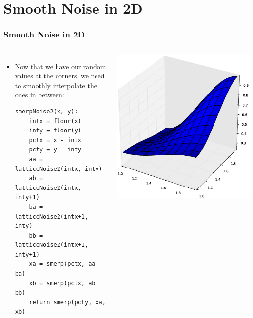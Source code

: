 \documentclass[slidestop,xcolor=pst]{beamer}
\newcommand{\sect}[1]{
\section{#1}
\begin{frame}[fragile]\frametitle{#1}
}
\begin{document}
\sect{Smooth Noise in 2D}
\begin{columns}[T]
\begin{itemize}
\item Now that we have our random values at the corners, we need to
  smoothly interpolate the ones in between:
\begin{verbatim}
smerpNoise2(x, y):
    intx = floor(x)
    inty = floor(y)
    pctx = x - intx
    pcty = y - inty
    aa = latticeNoise2(intx, inty)
    ab = latticeNoise2(intx, inty+1)
    ba = latticeNoise2(intx+1, inty)
    bb = latticeNoise2(intx+1, inty+1)
    xa = smerp(pctx, aa, ba)
    xb = smerp(pctx, ab, bb)
    return smerp(pcty, xa, xb)
\end{verbatim}
\end{itemize}
\includegraphics[width=\textwidth]{onesquaresurface.eps}
\end{columns}
\end{frame}
\end{document}
